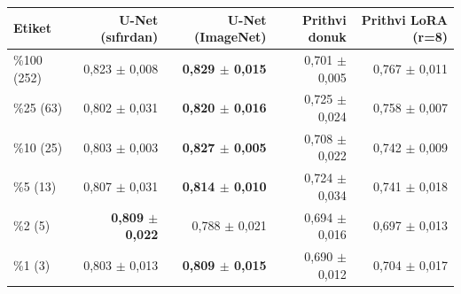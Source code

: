 \begin{tabular}{lrrrr}
\toprule
Etiket & U-Net (sıfırdan) & U-Net (ImageNet) & Prithvi donuk & Prithvi LoRA (r=8) \\
\midrule
\%100 (252) & 0,823 $\pm$ 0,008 & \textbf{0,829 $\pm$ 0,015} & 0,701 $\pm$ 0,005 & 0,767 $\pm$ 0,011 \\
\%25 (63) & 0,802 $\pm$ 0,031 & \textbf{0,820 $\pm$ 0,016} & 0,725 $\pm$ 0,024 & 0,758 $\pm$ 0,007 \\
\%10 (25) & 0,803 $\pm$ 0,003 & \textbf{0,827 $\pm$ 0,005} & 0,708 $\pm$ 0,022 & 0,742 $\pm$ 0,009 \\
\%5 (13) & 0,807 $\pm$ 0,031 & \textbf{0,814 $\pm$ 0,010} & 0,724 $\pm$ 0,034 & 0,741 $\pm$ 0,018 \\
\%2 (5) & \textbf{0,809 $\pm$ 0,022} & 0,788 $\pm$ 0,021 & 0,694 $\pm$ 0,016 & 0,697 $\pm$ 0,013 \\
\%1 (3) & 0,803 $\pm$ 0,013 & \textbf{0,809 $\pm$ 0,015} & 0,690 $\pm$ 0,012 & 0,704 $\pm$ 0,017 \\
\bottomrule
\end{tabular}
